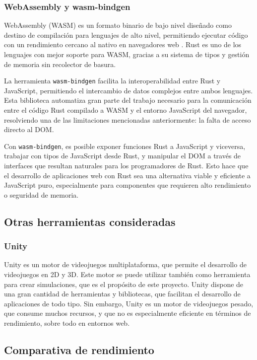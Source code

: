 \subsubsection{WebAssembly y wasm-bindgen}

WebAssembly (WASM) es un formato binario de bajo nivel diseñado como destino de compilación para lenguajes de alto nivel, permitiendo ejecutar código con un rendimiento cercano al nativo en navegadores web \autocite{WebAssembly}. Rust es uno de los lenguajes con mejor soporte para WASM, gracias a su sistema de tipos y gestión de memoria sin recolector de basura.

La herramienta \texttt{wasm-bindgen} \autocite{IntroductionWasmbindgenGuide} facilita la interoperabilidad entre Rust y JavaScript, permitiendo el intercambio de datos complejos entre ambos lenguajes. Esta biblioteca automatiza gran parte del trabajo necesario para la comunicación entre el código Rust compilado a WASM y el entorno JavaScript del navegador, resolviendo una de las limitaciones mencionadas anteriormente: la falta de acceso directo al DOM.

Con \texttt{wasm-bindgen}, es posible exponer funciones Rust a JavaScript y viceversa, trabajar con tipos de JavaScript desde Rust, y manipular el DOM a través de interfaces que resultan naturales para los programadores de Rust. Esto hace que el desarrollo de aplicaciones web con Rust sea una alternativa viable y eficiente a JavaScript puro, especialmente para componentes que requieren alto rendimiento o seguridad de memoria.

\subsection{Otras herramientas consideradas}
\subsubsection{Unity}
Unity es un motor de videojuegos multiplataforma, que permite el desarrollo de videojuegos en 2D y 3D. Este motor se puede utilizar también como herramienta para crear simulaciones, que es el propósito de este proyecto. Unity dispone de una gran cantidad de herramientas y bibliotecas, que facilitan el desarrollo de aplicaciones de todo tipo. Sin embargo, Unity es un motor de videojuegos pesado, que consume muchos recursos, y que no es especialmente eficiente en términos de rendimiento, sobre todo en entornos web.

\subsection{Comparativa de rendimiento}

